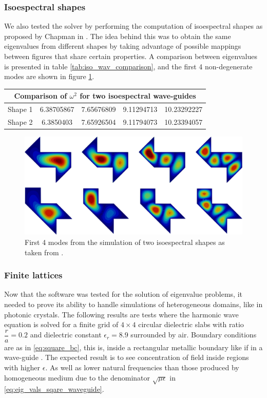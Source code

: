 \subsubsection{Isoespectral shapes}
We also tested the solver by performing the computation of isoespectral shapes as proposed by Chapman in \cite{Chapman1995}. The idea behind this was to obtain the same eigenvalues from different shapes by taking advantage of possible mappings between figures that share certain properties.
A comparison between eigenvalues is presented in table \ref{tab:iso_wav_comparison}, and the first 4 non-degenerate modes are shown in figure \ref{fig:isoespectral_waveguide}.
\begin{center}
\begin{tabular}{|c|c|c|c|c|}
\hline
\multicolumn{5}{|c|}{Comparison of $\omega^2$ for two isoespectral wave-guides} \\
\hline 
Shape 1  & 6.38705867 & 7.65676809 & 9.11294713 & 10.23292227 \\ 
\hline 
Shape 2 & 6.3850403 & 7.65926504 & 9.11794073 & 10.23394057 \\ 
\hline 
\end{tabular}
\label{tab:iso_wav_comparison}
\end{center}
\begin{figure}
\centering
\includegraphics[scale=0.1]{./img/isoespectral.pdf}
\caption{First 4 modes from the simulation of two isoespectral shapes as taken from \cite{Chapman1995}.}
\label{fig:isoespectral_waveguide}
\end{figure}

\subsubsection{Finite lattices}

Now that the software was tested for the solution of eigenvalue problems, it needed to prove its ability to handle simulations of heterogeneous domains, like in photonic crystals. The following results are tests where the harmonic wave equation is solved for a finite grid of $4\times 4$ circular dielectric slabs with ratio $\dfrac{r}{a}=0.2$ and dielectric constant $\epsilon_r = 8.9$ surrounded by air. Boundary conditions are as in \ref{eq:square_bc}, this is, inside a rectangular metallic boundary like if in a wave-guide . The expected result is to see concentration of field inside regions with higher $\epsilon$. As well as lower natural frequencies than those produced by homogeneous medium due to the denominator $\sqrt{\mu\epsilon}$ in \ref{eq:eig_vals_sqare_waveguide}. 

